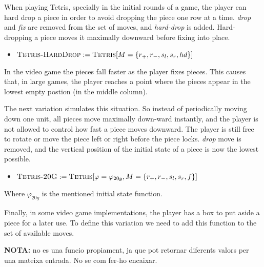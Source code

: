 When playing Tetris, specially in the initial rounds of a game, the player can hard drop a piece in order to avoid dropping the piece one row at a time. \emph{drop} and \emph{fix} are removed from the set of moves, and \emph{hard-drop} is added. Hard-dropping a piece moves it maximally downward before fixing into place. 

\begin{itemize}
  \item $\textsc{Tetris-HardDrop} := \textsc{Tetris}[M = \{ r_+, r_-, s_l, s_r, hd \}]$
\end{itemize}

In the video game the pieces fall faster as the player fixes pieces. This causes that, in large games, the player reaches a point where the pieces appear in the lowest empty postion (in the middle column).

The next variation simulates this situation. So instead of periodically moving down one unit, all pieces move maximally down-ward instantly, and the player is not allowed to control how fast a piece moves downward. The player is still free to rotate or move the piece left or right before the piece locks. \emph{drop} move is removed, and the vertical position of the initial state of a piece is now the lowest possible.

\begin{itemize}
  \item $\textsc{Tetris-20G} := \textsc{Tetris}[\varphi = \varphi_{20g}, M = \{ r_+, r_-, s_l, s_r, f \}]$
\end{itemize}

Where $\varphi_{20g}$ is the mentioned initial state function. 

\vspace{10px}
Finally, in some video game implementations, the player has a box to put aside a piece for a later use. To define this variation we need to add this function to the set of available moves.

\textbf{NOTA:} no es una funcio propiament, ja que pot retornar diferents valors per una mateixa entrada. No se com fer-ho encaixar.

